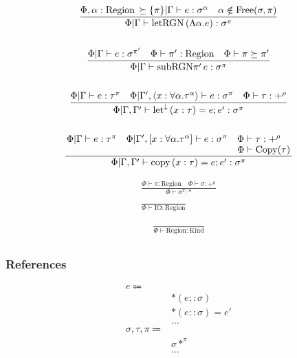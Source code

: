 \documentclass {article}
\begin{document}
\begin{gather*}
\frac
{\Phi , \alpha : \text{Region} \, \succeq \{ \pi \} | \Gamma \vdash e : \sigma^\alpha \quad \alpha \notin \text{Free}(\sigma, \pi)}
{\Phi | \Gamma \vdash \text{letRGN} \, (\Lambda \alpha. e) : \sigma^\pi} \\
\\
\frac
{\Phi | \Gamma \vdash e : \sigma^{\pi'} \quad \Phi \vdash \pi' : \text{Region} \quad \Phi \vdash \pi \succeq \pi' }
{\Phi | \Gamma \vdash \text{subRGN} \pi' \, e : \sigma^{\pi} } \\
\\
\frac
{\Phi | \Gamma \vdash e : \tau^\pi \quad \Phi | \Gamma', \langle x : \forall \alpha. \tau^\alpha \rangle \vdash e : \sigma^\pi \quad \Phi \vdash \tau : +^{\rho}}
{\Phi | \Gamma, \Gamma' \vdash \text{let}^\downarrow \, (x : \tau) = e; e' : \sigma^\pi} \\
\\
\frac
{\splitfrac{\Phi | \Gamma \vdash e : \tau^\pi \quad \Phi | \Gamma', [ x : \forall \alpha. \tau^\alpha ] \vdash e : \sigma^\pi \quad \Phi \vdash \tau : +^{\rho}}
{\Phi \vdash \text{Copy}(\tau)}}
{\Phi | \Gamma, \Gamma' \vdash \text{copy} \, (x : \tau) = e; e' : \sigma^\pi} \\
\end{gather*}

\begin{gather*}
\frac
{\Phi \vdash \pi : \text{Region} \quad \Phi \vdash \sigma : +^\rho}
{\Phi \vdash \sigma^\pi : *} \\
\\
\frac
{}
{\Phi \vdash \text{IO} : \text{Region}}
\end{gather*}

\begin{gather*}
\frac
{}
{\Phi \vdash \text{Region} : \text{Kind}} \\
\end{gather*}

\subsubsection{References}
\begin{align*}
e \Coloneqq & \\
& *(e :: \sigma) \tag{Read Pointer} \\
& *(e :: \sigma) = e' \tag{Write Pointer} \\
& \dots \\
\sigma, \tau, \pi \Coloneqq & \\
& \sigma *^\pi \tag{Reference} \\
& \dots \\
\end{align*}
\end{document}
